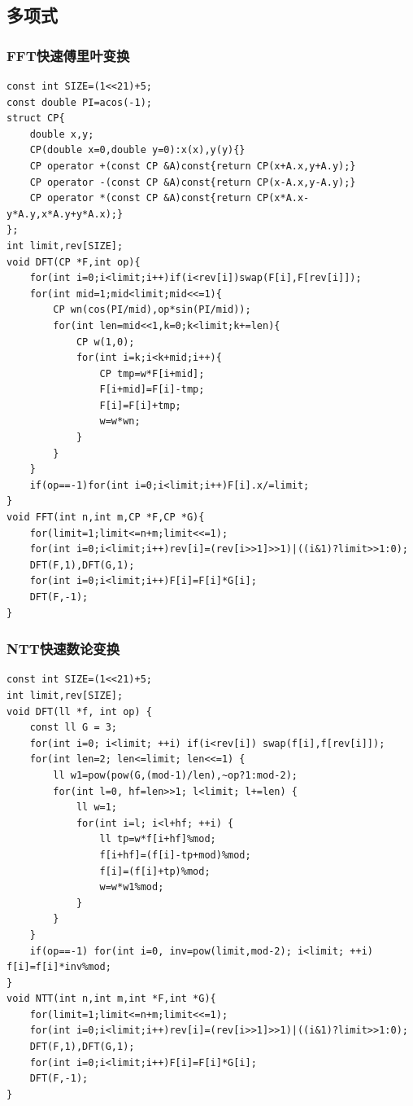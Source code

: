 \documentclass[a4]{ctexart}
\begin{document}
\subsection{多项式}
\subsubsection{FFT快速傅里叶变换}
\begin{lstlisting}
const int SIZE=(1<<21)+5;
const double PI=acos(-1);
struct CP{
    double x,y;
    CP(double x=0,double y=0):x(x),y(y){}
    CP operator +(const CP &A)const{return CP(x+A.x,y+A.y);}
    CP operator -(const CP &A)const{return CP(x-A.x,y-A.y);}
    CP operator *(const CP &A)const{return CP(x*A.x-y*A.y,x*A.y+y*A.x);}
};
int limit,rev[SIZE];
void DFT(CP *F,int op){
    for(int i=0;i<limit;i++)if(i<rev[i])swap(F[i],F[rev[i]]);
    for(int mid=1;mid<limit;mid<<=1){
        CP wn(cos(PI/mid),op*sin(PI/mid));
        for(int len=mid<<1,k=0;k<limit;k+=len){
            CP w(1,0);
            for(int i=k;i<k+mid;i++){
                CP tmp=w*F[i+mid];
                F[i+mid]=F[i]-tmp;
                F[i]=F[i]+tmp;
                w=w*wn;
            }
        }
    }
    if(op==-1)for(int i=0;i<limit;i++)F[i].x/=limit;
}
void FFT(int n,int m,CP *F,CP *G){
    for(limit=1;limit<=n+m;limit<<=1);
    for(int i=0;i<limit;i++)rev[i]=(rev[i>>1]>>1)|((i&1)?limit>>1:0);
    DFT(F,1),DFT(G,1);
    for(int i=0;i<limit;i++)F[i]=F[i]*G[i];
    DFT(F,-1);
}
\end{lstlisting}
\subsubsection{NTT快速数论变换}
\begin{lstlisting}
const int SIZE=(1<<21)+5;
int limit,rev[SIZE];
void DFT(ll *f, int op) {
    const ll G = 3;
    for(int i=0; i<limit; ++i) if(i<rev[i]) swap(f[i],f[rev[i]]);
    for(int len=2; len<=limit; len<<=1) {
        ll w1=pow(pow(G,(mod-1)/len),~op?1:mod-2);
        for(int l=0, hf=len>>1; l<limit; l+=len) {
            ll w=1;
            for(int i=l; i<l+hf; ++i) {
                ll tp=w*f[i+hf]%mod;
                f[i+hf]=(f[i]-tp+mod)%mod;
                f[i]=(f[i]+tp)%mod;
                w=w*w1%mod;
            }
        }
    }
    if(op==-1) for(int i=0, inv=pow(limit,mod-2); i<limit; ++i) f[i]=f[i]*inv%mod;
}
void NTT(int n,int m,int *F,int *G){
    for(limit=1;limit<=n+m;limit<<=1);
    for(int i=0;i<limit;i++)rev[i]=(rev[i>>1]>>1)|((i&1)?limit>>1:0);
    DFT(F,1),DFT(G,1);
    for(int i=0;i<limit;i++)F[i]=F[i]*G[i];
    DFT(F,-1);
}
\end{lstlisting}
\end{document}
